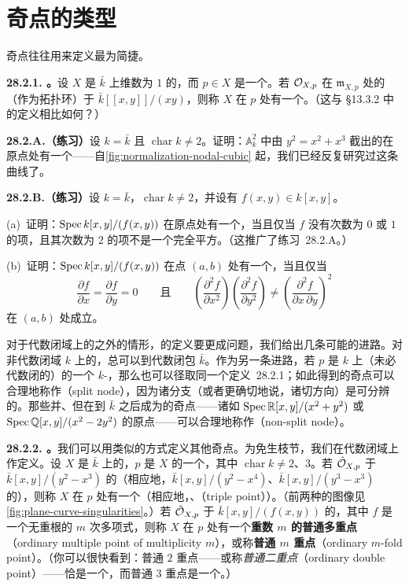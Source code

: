 
\section{奇点的类型}

奇点往往用\trCompletion{}来定义最为简捷。

\textbf{28.2.1. \trhDefinition。}\quad 设 $X$ 是 $\bar{k}$ 上维数为 $1$ 的\trVariety，而 $p\in X$ 是一个\trClosedPoint。若 $\mathcal{O}_{X,p}$ 在 $\mathfrak{m}_{X,p}$ 处的\trCompletion{}（作为拓扑环）\trIsomorphic{}于 $\bar{k}[[x,y]]/(xy)$，则称 $X$ 在 $p$ 处有一个\textbf{\trNode}。（这与 \S13.3.2 中\trNode{}的定义相比如何？）

\textbf{28.2.A.（练习）}\quad 设 $k=\bar{k}$ 且 $\operatorname{char}k\neq 2$。证明：$\mathbb{A}^2_k$ 中由 $y^2=x^2+x^3$ 截出的\trCurve{}在原点处有一个\trNode{}——自\cref{fig:normalization-nodal-cubic} 起，我们已经反复研究过这条曲线了。

\textbf{28.2.B.（练习）}\quad 设 $k=\bar{k}$，$\operatorname{char}k\neq 2$，并设有 $f(x,y)\in k[x,y]$。

(a)~证明：$\operatorname{Spec} k[x,y]/(f(x,y))$ 在原点处有一个\trNode，当且仅当 $f$ 没有次数为 $0$ 或 $1$ 的项，且其次数为 $2$ 的项不是一个完全平方。（这推广了\mbox{练习~28.2.A}。）

(b)~证明：$\operatorname{Spec} k[x,y]/(f(x,y))$ 在点 $(a,b)$ 处有一个\trNode，当且仅当
\[
\frac{\partial f}{\partial x}=\frac{\partial f}{\partial y}=0
\qquad\text{且}\qquad
\left(\frac{\partial^2 f}{\partial x^2}\right)\left(\frac{\partial^2 f}{\partial y^2}\right)\neq\left(\frac{\partial^2 f}{\partial x\,\partial y}\right)^{\!2}
\]
在 $(a,b)$ 处成立。

对于代数闭域上的\trVariety{}之外的情形，\trNode{}的定义要更成问题，我们给出几条可能的进路。对非代数闭域 $k$ 上的\trVariety，总可以\trBaseChange{}到代数闭包 $\bar{k}$。作为另一条进路，若 $p$ 是 $k$ 上（未必代数闭的）\trVariety{}的一个 $k$-\trValuedPoint，那么也可以径取同一个\mbox{定义~28.2.1}；如此得到的奇点可以合理地称作\emph{\trSplitNode}（split node），因为诸分支（或者更确切地说，诸切方向）是可分辨的。那些并\trNonSplitNode、但在\trBaseChange{}到 $\bar{k}$ 之后成为\trNode{}的奇点——诸如 $\operatorname{Spec}\mathbb{R}[x,y]/(x^2+y^2)$ 或 $\operatorname{Spec}\mathbb{Q}[x,y]/(x^2-2y^2)$ 的原点——可以合理地称作\emph{\trNonSplitNode}（non-split node）。

\textbf{28.2.2. \trhDefinition。}\quad 我们可以用类似的方式定义其他奇点。为免生枝节，我们在代数闭域上作定义。设 $X$ 是 $\bar{k}$ 上的\trVariety，$p$ 是 $X$ 的一个\trClosedPoint，其中 $\operatorname{char}k\neq 2$、$3$。若 $\hat{\mathcal{O}}_{X,p}$ \trIsomorphic{}于 $\bar{k}[x,y]/(y^2-x^3)$ 的\trCompletion（相应地，$\bar{k}[x,y]/(y^2-x^4)$、$\bar{k}[x,y]/(y^3-x^3)$ 的\trCompletion），则称 $X$ 在 $p$ 处有一个\textbf{\trCusp}（相应地，\textbf{\trTacnode}、\textbf{\trTriplePoint{}}（triple point））。（前两种的图像见\cref{fig:plane-curve-singularities}。）若 $\hat{\mathcal{O}}_{X,p}$ \trIsomorphic{}于 $\bar{k}[x,y]/(f(x,y))$ 的\trCompletion，其中 $f$ 是一个无重根的 $m$ 次\trHomogeneous{}多项式，则称 $X$ 在 $p$ 处有一个\textbf{重数 $m$ 的普通多重点}（ordinary multiple point of multiplicity $m$），或称\textbf{普通 $m$ 重点}（ordinary $m$-fold point）。（你可以很快看到：普通 $2$ 重点——或称\emph{普通二重点}（ordinary double point）——恰是一个\trNode，而普通 $3$ 重点是一个\trTriplePoint{}。）

